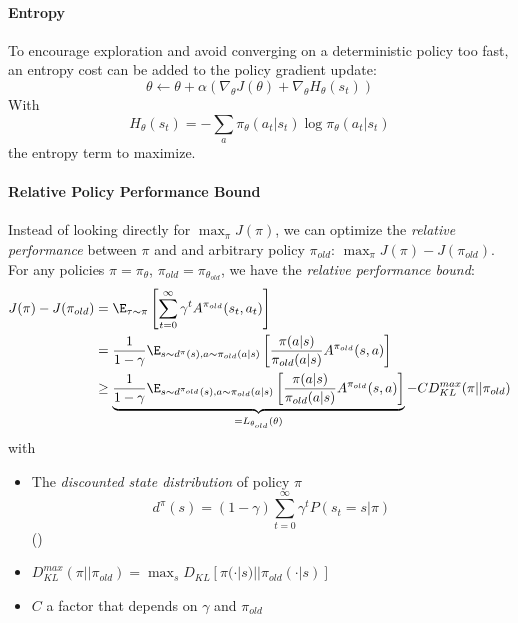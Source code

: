 \paragraph{Entropy}
To encourage exploration and avoid converging on a deterministic policy too fast, an entropy cost can be added to the policy gradient update: 
\[
    \theta \leftarrow \theta + \alpha (\nabla_\theta J(\theta) + \nabla_\theta H_\theta(s_t))
\]
With
\[
    H_\theta(s_t) = - \sum_a \pi_\theta(a_t|s_t) \log \pi_\theta(a_t|s_t)
\]
the entropy term to maximize.

\paragraph{Relative Policy Performance Bound}
Instead of looking directly for $\max_\pi J(\pi)$, we can optimize the \emph{relative performance} between $\pi$ and and arbitrary policy $\pi_{old}$: $\max_\pi J(\pi) - J(\pi_{old})$. For any policies $\pi = \pi_\theta$, $\pi_{old} = \pi_{\theta_{old}}$, we have the \emph{relative performance bound}:
\begin{align}
    J(\pi) - J(\pi_{old}) 
    &= \E_{\tau \sim \pi} \left[ \sum_{t=0}^\infty \gamma^t A^{\pi_{old}}(s_t,a_t) \right] \nonumber\\
    &= \frac{1}{1-\gamma} \E_{s\sim d^\pi(s), a \sim \pi_{old}(a|s)} \left[ \frac{\pi(a|s)}{\pi_{old}(a|s)} A^{\pi_{old}}(s,a)\right] \nonumber\\
    &\geq \underbrace{\frac{1}{1-\gamma} \E_{s\sim d^{\pi_{old}}(s), a \sim \pi_{old}(a|s)} \left[ 
        \frac{\pi(a|s)}{\pi_{old}(a|s)} A^{\pi_{old}}(s,a)
    \right]}_{=L_{\theta_{old}}(\theta)} - C D_{KL}^{max}(\pi || \pi_{old})
    \label{eq:performance-bound}
\end{align}
with
\begin{itemize}
    \item The \emph{discounted state distribution} of policy $\pi$
    \begin{equation}
        d^\pi(s) = (1-\gamma) \sum_{t=0}^\infty \gamma^t P(s_{t}=s|\pi)
    \label{eq:stationary-state-distribution}
    \end{equation}
    ()
    \item $D_{KL}^{max}(\pi || \pi_{old}) = \max_s D_{KL}[\pi(\cdot|s) || \pi_{old}(\cdot|s)]$
    \item $C$ a factor that depends on $\gamma$ and $\pi_{old}$
\end{itemize}
